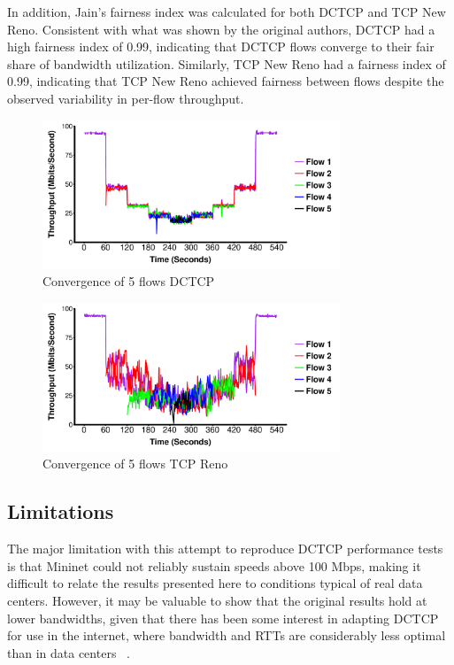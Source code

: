 In addition, Jain's fairness index was calculated for both DCTCP and TCP New Reno. Consistent with what was shown by the original authors, DCTCP had a high fairness index of 0.99, indicating that DCTCP flows converge to their fair share of bandwidth utilization. Similarly, TCP New Reno had a fairness index of 0.99, indicating that TCP New Reno achieved fairness between flows despite the observed variability in per-flow throughput. 

\begin{figure}
\includegraphics[height=1.75in,width=3.5in]{dctcp_converg}
\caption{Convergence of 5 flows DCTCP}
\end{figure}

\begin{figure}
\includegraphics[height=1.75in,width=3.5in]{reno_converg}
\caption{Convergence of 5 flows TCP Reno}
\end{figure}

\subsection{Limitations}

The major limitation with this attempt to reproduce DCTCP performance tests is that Mininet could not reliably sustain speeds above 100 Mbps, making it difficult to relate the results presented here to conditions typical of real data centers. However, it may be valuable to show that the original results hold at lower bandwidths, given that there has been some interest in adapting DCTCP for use in the internet, where bandwidth and RTTs are considerably less optimal than in data centers ~\cite{kuhlewind_using_2014}.

